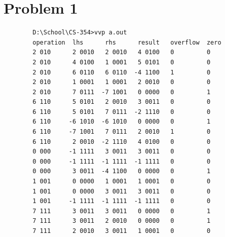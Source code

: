 \documentclass{article}
\newenvironment{problem}[1]{
  \nobreak\section*{Problem #1}
}{}
\begin{document}
\begin{problem}{1}
    \begin{center}
      \begin{lstlisting}
        D:\School\CS-354>vvp a.out
        operation  lhs      rhs      result   overflow  zero
        2 010      2 0010   2 0010   4 0100   0         0
        2 010      4 0100   1 0001   5 0101   0         0
        2 010      6 0110   6 0110  -4 1100   1         0
        2 010      1 0001   1 0001   2 0010   0         0
        2 010      7 0111  -7 1001   0 0000   0         1
        6 110      5 0101   2 0010   3 0011   0         0
        6 110      5 0101   7 0111  -2 1110   0         0
        6 110     -6 1010  -6 1010   0 0000   0         1
        6 110     -7 1001   7 0111   2 0010   1         0
        6 110      2 0010  -2 1110   4 0100   0         0
        0 000     -1 1111   3 0011   3 0011   0         0
        0 000     -1 1111  -1 1111  -1 1111   0         0
        0 000      3 0011  -4 1100   0 0000   0         1
        1 001      0 0000   1 0001   1 0001   0         0
        1 001      0 0000   3 0011   3 0011   0         0
        1 001     -1 1111  -1 1111  -1 1111   0         0
        7 111      3 0011   3 0011   0 0000   0         1
        7 111      3 0011   2 0010   0 0000   0         1
        7 111      2 0010   3 0011   1 0001   0         0
      \end{lstlisting}
    \end{center}
  \end{problem}
\end{document}
